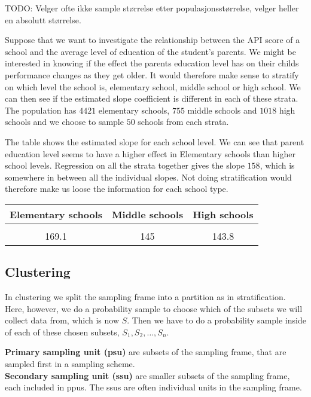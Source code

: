\documentclass{article}
\begin{document}
TODO: Velger ofte ikke sample størrelse etter populasjonsstørrelse, velger
heller en absolutt størrelse.

\begin{example}
  Suppose that we want to investigate the relationship between the API score of
  a school and the average level of education of the student's parents. We might
  be interested in knowing if the effect the parents education level has on
  their childs performance changes as they get older. It would therefore make
  sense to stratify on which level the school is, elementary school, middle
  school or high school. We can then see if the estimated slope coefficient is
  different in each of these strata.
  The population has \(4421\) elementary schools, \(755\) middle schools and
  \(1018\) high schools and we choose to sample \(50\) schools from each strata.

  The table shows the estimated slope for each school level. We can see that
  parent education level seems to have a higher effect in Elementary schools
  than higher school levels. Regression on all the strata together gives the
  slope \(158\), which is somewhere in between all the individual slopes. Not
  doing stratification would therefore make us loose the information for each
  school type.

  \begin{tabular}{ccc}
    Elementary schools & Middle schools & High schools \\
    \hline \\
    169.1 & 145 & 143.8
  \end{tabular}
\end{example}



\subsection{Clustering}

In clustering we split the sampling frame into a partition as in stratification.
Here, however, we do a probability sample to choose which of the subsets we will
collect data from, which is now \(S\). Then we have to do a probability sample
inside of each of these chosen subsets, \(S_1, S_2, \dots, S_n\).

\begin{definition}
 \textbf{Primary sampling unit (psu)} are subsets of the sampling frame, that
 are sampled first in a sampling scheme. \\
 \textbf{Secondary sampling unit (ssu)} are smaller subsets of the sampling
 frame, each included in ppus. The ssus are often individual units in the
 sampling frame.
\end{definition}
\end{document}

